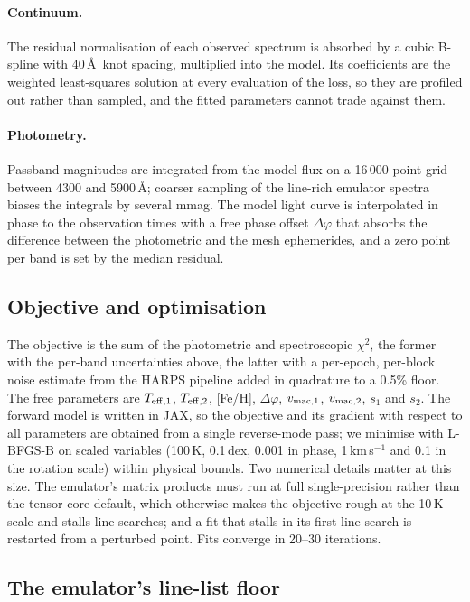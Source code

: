 \paragraph{Continuum.}
The residual normalisation of each observed spectrum is absorbed by a cubic
B-spline with 40\,\AA\ knot spacing, multiplied into the model. Its coefficients
are the weighted least-squares solution at every evaluation of the loss, so they
are profiled out rather than sampled, and the fitted parameters cannot trade
against them.

\paragraph{Photometry.}
Passband magnitudes are integrated from the model flux on a 16\,000-point grid
between 4300 and 5900\,\AA; coarser sampling of the line-rich emulator spectra
biases the integrals by several mmag. The model light curve is interpolated in
phase to the observation times with a free phase offset $\Delta\varphi$ that
absorbs the difference between the photometric and the mesh ephemerides, and a
zero point per band is set by the median residual.

\subsection{Objective and optimisation}

The objective is the sum of the photometric and spectroscopic $\chi^2$, the
former with the per-band uncertainties above, the latter with a per-epoch,
per-block noise estimate from the HARPS pipeline added in quadrature to a 0.5\%
floor. The free parameters are $T_{\rm eff,1}$, $T_{\rm eff,2}$, [Fe/H],
$\Delta\varphi$, $v_{\rm mac,1}$, $v_{\rm mac,2}$, $s_1$ and $s_2$. The forward
model is written in JAX, so the objective and its gradient with respect to all
parameters are obtained from a single reverse-mode pass; we minimise with
L-BFGS-B on scaled variables (100\,K, 0.1\,dex, 0.001 in phase, 1\,km\,s$^{-1}$
and 0.1 in the rotation scale) within physical bounds. Two numerical details
matter at this size. The emulator's matrix products must run at full
single-precision rather than the tensor-core default, which otherwise makes the
objective rough at the 10\,K scale and stalls line searches; and a fit that
stalls in its first line search is restarted from a perturbed point. Fits
converge in 20--30 iterations.

\subsection{The emulator's line-list floor}

